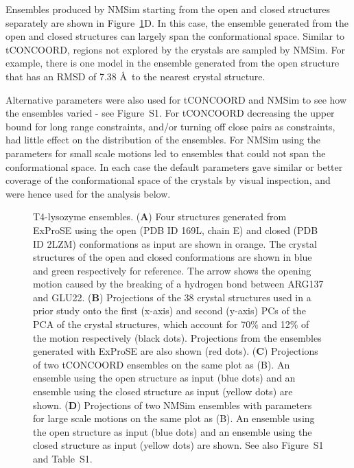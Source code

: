 Ensembles produced by NMSim starting from the open and closed structures separately are shown in Figure~\ref{fig:t4l}D.
In this case, the ensemble generated from the open and closed structures can largely span the conformational space.
Similar to tCONCOORD, regions not explored by the crystals are sampled by NMSim.
For example, there is one model in the ensemble generated from the open structure that has an RMSD of 7.38 \AA\ to the nearest crystal structure.

Alternative parameters were also used for tCONCOORD and NMSim to see how the ensembles varied - see Figure~S1.
For tCONCOORD decreasing the upper bound for long range constraints, and/or turning off close pairs as constraints, had little effect on the distribution of the ensembles.
For NMSim using the parameters for small scale motions led to ensembles that could not span the conformational space.
In each case the default parameters gave similar or better coverage of the conformational space of the crystals by visual inspection, and were hence used for the analysis below.


\begin{figure}
\centering


\caption{T4-lysozyme ensembles.
(\textbf{A}) Four structures generated from ExProSE using the open (PDB ID 169L, chain E)  and closed (PDB ID 2LZM) conformations as input are shown in orange.
The crystal structures of the open and closed conformations are shown in blue and green respectively for reference.
The arrow shows the opening motion caused by the breaking of a hydrogen bond between ARG137 and GLU22.
(\textbf{B}) Projections of the 38 crystal structures used in a prior study \cite{DeGroot1998} onto the first (x-axis) and second (y-axis) PCs of the PCA of the crystal structures, which account for 70\% and 12\% of the motion respectively (black dots).
Projections from the ensembles generated with ExProSE are also shown (red dots).
(\textbf{C}) Projections of two tCONCOORD ensembles on the same plot as (B).
An ensemble using the open structure as input (blue dots) and an ensemble using the closed structure as input (yellow dots) are shown.
(\textbf{D}) Projections of two NMSim ensembles with parameters for large scale motions on the same plot as (B).
An ensemble using the open structure as input (blue dots) and an ensemble using the closed structure as input (yellow dots) are shown.
See also Figure~S1 and Table~S1.}

\label{fig:t4l}
\end{figure}


